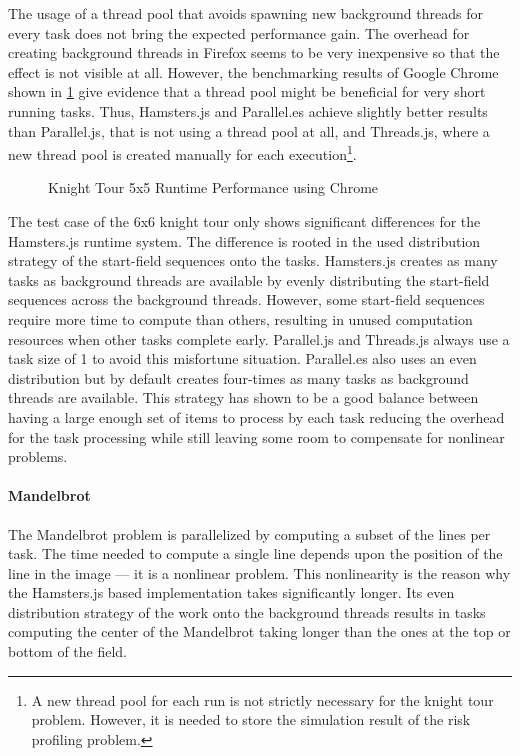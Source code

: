 The usage of a thread pool that avoids spawning new background threads for every task does not bring the expected performance gain. The overhead for creating background threads in Firefox seems to be very inexpensive so that the effect is not visible at all. However, the benchmarking results of Google Chrome shown in \cref{fig:runtime-performance-chrome} give evidence that a thread pool might be beneficial for very short running tasks. Thus, Hamsters.js and Parallel.es achieve slightly better results than Parallel.js, that is not using a thread pool at all, and Threads.js, where a new thread pool is created manually for each execution\footnote{A new thread pool for each run is not strictly necessary for the knight tour problem. However, it is needed to store the simulation result of the risk profiling problem.}. 

\begin{figure}
	\centering
	
	\caption{Knight Tour 5x5 Runtime Performance using Chrome}
	\label{fig:runtime-performance-chrome}
\end{figure}

The test case of the 6x6 knight tour only shows significant differences for the Hamsters.js runtime system. The difference is rooted in the used distribution strategy of the start-field sequences onto the tasks. Hamsters.js creates as many tasks as background threads are available by evenly distributing the start-field sequences across the background threads. However, some start-field sequences require more time to compute than others, resulting in unused computation resources when other tasks complete early. Parallel.js and Threads.js always use a task size of 1 to avoid this misfortune situation. Parallel.es also uses an even distribution but by default creates four-times as many tasks as background threads are available. This strategy has shown to be a good balance between having a large enough set of items to process by each task reducing the overhead for the task processing while still leaving some room to compensate for nonlinear problems. 

\paragraph{Mandelbrot}
The Mandelbrot problem is parallelized by computing a subset of the lines per task. The time needed to compute a single line depends upon the position of the line in the image --- it is a nonlinear problem. This nonlinearity is the reason why the Hamsters.js based implementation takes significantly longer. Its even distribution strategy of the work onto the background threads results in tasks computing the center of the Mandelbrot taking longer than the ones at the top or bottom of the field. 

